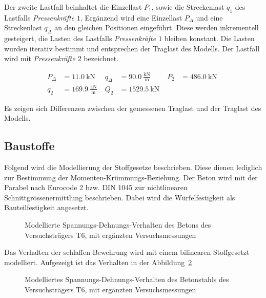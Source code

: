 \documentclass[
  11pt,
  letterpaper,
]{scrreprt}
\begin{document}
Der zweite Lastfall beinhaltet die Einzellast \(P_{1}\), sowie die
Streckenlast \(q_1\) des Lastfalls \emph{Pressenkräfte \(1\)}. Ergänzend
wird eine Einzellast \(P_{\Delta}\) und eine Streckenlast \(q_{\Delta}\)
an den gleichen Positionen eingeführt. Diese werden inkrementell
gesteigert, die Lasten des Lastfalls \emph{Pressenkräfte \(1\)} bleiben
konstant. Die Lasten wurden iterativ bestimmt und entsprechen der
Traglast des Modells. Der Lastfall wird mit \emph{Pressenkräfte \(2\)}
bezeichnet.

$$
\begin{aligned}
P_{\Delta} &= 11.0\ \mathrm{kN} \; 
 &q_{\Delta} &= 90.0\ \frac{\mathrm{kN}}{\mathrm{m}} \; 
 &P_{2} &= 486.0\ \mathrm{kN} \; 
\\[10pt]
 q_{2} &= 169.9\ \frac{\mathrm{kN}}{\mathrm{m}} \; 
 &Q_{2} &= 1529.5\ \mathrm{kN} \;
\end{aligned}
$$

Es zeigen sich Differenzen zwischen der gemessenen Traglast und der
Traglast des Modells.

\subsection{Baustoffe}\label{baustoffe}

Folgend wird die Modellierung der Stoffgesetze beschrieben. Diese dienen
lediglich zur Bestimmung der Momenten-Krümmungs-Beziehung. Der Beton
wird mit der Parabel nach Eurocode 2 bzw. DIN 1045 zur nichtlinearen
Schnittgrössenermittlung beschrieben. Dabei wird die Würfelfestigkeit
als Bauteilfestigkeit angesetzt.

\begin{figure}[H]


\caption{\label{fig-sigma_epc_t6}Modellierte
Spannungs-Dehnungs-Verhalten des Betons des Versuchsträgers T6, mit
ergänzten Versuchsmessungen}

\end{figure}%

Das Verhalten der schlaffen Bewehrung wird mit einem bilinearen
Stoffgesetzt modelliert. Aufgezeigt ist das Verhalten in der
Abbildung~\ref{fig-sigma_eps_t6}

\begin{figure}[H]


\caption{\label{fig-sigma_eps_t6}Modelliertes
Spannungs-Dehnungs-Verhalten des Betonstahls des Versuchsträgers T6, mit
ergänzten Versuchsmessungen}

\end{figure}%
\end{document}
